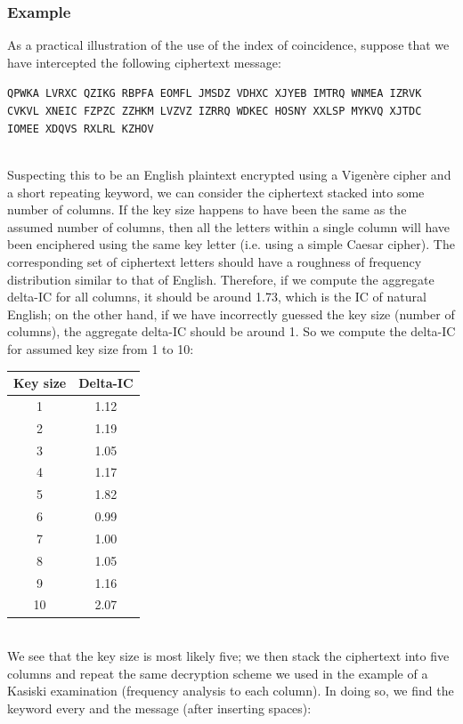 \documentclass[Lau,binding=0.6cm,oneside]{sapthesis}
\begin{document}
\subsubsection{Example}
As a practical illustration of the use of the index of coincidence, suppose that we have intercepted the following ciphertext message:
\begin{displayquote}{\small{\texttt{QPWKA LVRXC QZIKG RBPFA EOMFL  JMSDZ VDHXC XJYEB IMTRQ WNMEA IZRVK CVKVL XNEIC FZPZC ZZHKM  LVZVZ IZRRQ WDKEC HOSNY XXLSP
MYKVQ XJTDC IOMEE XDQVS RXLRL  KZHOV}}}
\end{displayquote}
\ \\
Suspecting this to be an English plaintext encrypted using a Vigenère cipher and a short repeating keyword, we can consider the ciphertext stacked into some number of columns. If the key size happens to have been the same as the assumed number of columns, then all the letters within a single column will have been enciphered using the same key letter (i.e. using a simple Caesar cipher). The corresponding set of ciphertext letters should have a roughness of frequency distribution similar to that of English. Therefore, if we compute the aggregate delta-IC for all columns, it should be around 1.73, which is the IC of natural English; on the other hand, if we have incorrectly guessed the key size (number of columns), the aggregate delta-IC should be around 1. So we compute the delta-IC for assumed key size from 1 to 10:\\

\begin{center}
 \begin{tabular}{||c c||} 
 \hline
 Key size & Delta-IC\\ [0.5ex] 
 \hline\hline
 1 & 1.12\\ 
 \hline
 2 & 1.19\\
 \hline
 3 & 1.05\\
 \hline
 4 & 1.17\\
 \hline
 5 & 1.82\\
 \hline
 6 & 0.99\\
 \hline
 7 & 1.00\\
 \hline
 8 & 1.05\\
 \hline
 9 & 1.16\\
 \hline
 10 & 2.07\\
 \hline
\end{tabular}
\end{center}
\ \\
We see that the key size is most likely five; we then stack the ciphertext into five columns and repeat the same decryption scheme we used in the example of a Kasiski examination (frequency analysis to each column). In doing so, we find the keyword \textsf{every} and the message (after inserting spaces):\\
\end{document}
